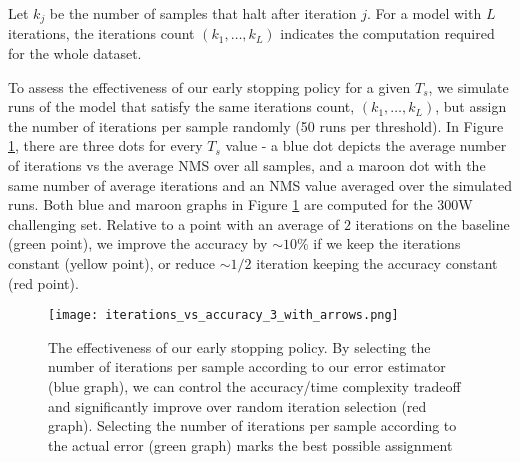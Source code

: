 \documentclass[twocolumn]{article}
\begin{document}
Let $k_j$ be the number of samples that halt after iteration $j$. For a model with $L$ iterations, the iterations count $(k_1,\ldots,k_L)$   indicates the computation required for the whole dataset.

To assess the effectiveness of our early stopping policy for a given $T_s$, we simulate runs of the model that satisfy the same iterations count, $(k_1,\ldots,k_L)$, but assign the number of iterations per sample randomly (50 runs per threshold). In Figure \ref{fig:iterations_vs_accuracy}, there are three dots for every $T_s$ value - a blue dot depicts the average number of iterations vs the average NMS over all samples, and a maroon dot with the same number of average iterations and an NMS value averaged over the simulated runs. Both blue and maroon graphs in Figure \ref{fig:iterations_vs_accuracy} are computed for the 300W challenging set. Relative to a point with an average of $2$ iterations on the baseline (green point), we improve the accuracy by $\sim10\%$ if we keep the iterations constant (yellow point), or reduce $\sim1/2$ iteration keeping the accuracy constant (red point).



\fi



\begin{figure}
\texttt{[image: iterations\_vs\_accuracy\_3\_with\_arrows.png]}
\caption{The effectiveness of our early stopping policy. By selecting the number of iterations per sample according to our error estimator (blue graph), we can control the accuracy/time complexity tradeoff and significantly improve over random iteration selection (red graph). Selecting the number of iterations per sample according to the actual error (green graph) marks the best possible assignment}
\label{fig:iterations_vs_accuracy}
\end{figure}



\end{document}
